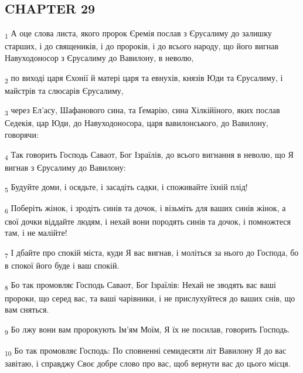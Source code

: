 \subsection{CHAPTER 29}
\begin{tcolorbox}
\textsubscript{1} А оце слова листа, якого пророк Єремія послав з Єрусалиму до залишку старших, і до священиків, і до пророків, і до всього народу, що його вигнав Навуходоносор з Єрусалиму до Вавилону, в неволю,
\end{tcolorbox}
\begin{tcolorbox}
\textsubscript{2} по виході царя Єхонії й матері царя та евнухів, князів Юди та Єрусалиму, і майстрів та слюсарів Єрусалиму,
\end{tcolorbox}
\begin{tcolorbox}
\textsubscript{3} через Ел'асу, Шафанового сина, та Ґемарію, сина Хілкійїного, яких послав Седекія, цар Юди, до Навуходоносора, царя вавилонського, до Вавилону, говорячи:
\end{tcolorbox}
\begin{tcolorbox}
\textsubscript{4} Так говорить Господь Саваот, Бог Ізраїлів, до всього вигнання в неволю, що Я вигнав з Єрусалиму до Вавилону:
\end{tcolorbox}
\begin{tcolorbox}
\textsubscript{5} Будуйте доми, і осядьте, і засадіть садки, і споживайте їхній плід!
\end{tcolorbox}
\begin{tcolorbox}
\textsubscript{6} Поберіть жінок, і зродіть синів та дочок, і візьміть для ваших синів жінок, а свої дочки віддайте людям, і нехай вони породять синів та дочок, і помножтеся там, і не малійте!
\end{tcolorbox}
\begin{tcolorbox}
\textsubscript{7} І дбайте про спокій міста, куди Я вас вигнав, і моліться за нього до Господа, бо в спокої його буде і ваш спокій.
\end{tcolorbox}
\begin{tcolorbox}
\textsubscript{8} Бо так промовляє Господь Саваот, Бог Ізраїлів: Нехай не зводять вас ваші пророки, що серед вас, та ваші чарівники, і не прислухуйтеся до ваших снів, що вам сняться.
\end{tcolorbox}
\begin{tcolorbox}
\textsubscript{9} Бо лжу вони вам пророкують Ім'ям Моїм, Я їх не посилав, говорить Господь.
\end{tcolorbox}
\begin{tcolorbox}
\textsubscript{10} Бо так промовляє Господь: По сповненні семидесяти літ Вавилону Я до вас завітаю, і справджу Своє добре слово про вас, щоб вернути вас до цього місця.
\end{tcolorbox}
